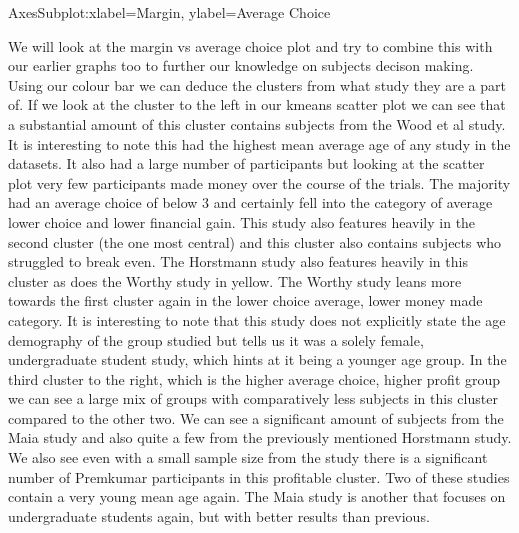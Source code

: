 \documentclass[letterpaper,10pt,english]{jupyterBook}
\begin{document}
\begin{sphinxVerbatim}[commandchars=\\\{\}]
\PYGZlt{}AxesSubplot:xlabel=\PYGZsq{}Margin\PYGZsq{}, ylabel=\PYGZsq{}Average Choice\PYGZsq{}\PYGZgt{}
\end{sphinxVerbatim}

\noindent{}

\sphinxAtStartPar
We will look at the margin vs average choice plot and try to combine this with our earlier graphs too to further our knowledge on subjects decison making. Using our colour bar we can deduce the clusters from what study they are a part of. If we look at the cluster to the left in our k\sphinxhyphen{}means scatter plot we can see that a substantial amount of this cluster contains subjects from the Wood et al study. It is interesting to note this had the highest mean average age of any study in the datasets. It also had a large number of participants but looking at the scatter plot very few participants made money over the course of the trials. The majority had an average choice of below 3 and certainly fell into the category of average lower choice and lower financial gain. This study also features heavily in the second cluster (the one most central) and this cluster also contains subjects who struggled to break even. The Horstmann study also features heavily in this cluster as does the Worthy study in yellow. The Worthy study leans more towards the first cluster again in the lower choice average, lower money made category. It is interesting to note that this study does not explicitly state the age demography of the group studied but tells us it was a solely female, undergraduate student study, which hints at it being a younger age group. In the third cluster to the right, which is the higher average choice, higher profit group we can see a large mix of groups with comparatively less subjects in this cluster compared to the other two. We can see a significant amount of subjects from the Maia study and also quite a few from the previously mentioned Horstmann study. We also see even with a small sample size from the study there is a significant number of Premkumar participants in this profitable cluster. Two of these studies contain a very young mean age again. The Maia study is another that focuses on undergraduate students again, but with better results than previous.
\end{document}
